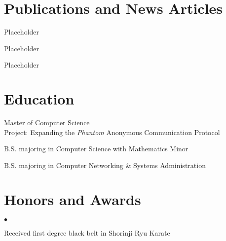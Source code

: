 \documentclass{resume}
\begin{document}
\section{Publications and News Articles}
\begin{position}
  \item Placeholder
\end{position}

\begin{position}
  \item Placeholder
\end{position}

\begin{position}
  \item Placeholder
\end{position}

\section{Education}
\begin{school}
 \item Master of Computer Science\\
 {Project:} {\sffamily Expanding the \emph{Phantom} Anonymous Communication Protocol}\\
\end{school}

\begin{school}
     \item B.S. majoring in Computer Science with Mathematics Minor
     \item B.S. majoring in Computer Networking \& Systems Administration
\end{school}

\section{Honors and Awards}
    \begin{list}{$\bullet$}{\topsep \itemsep}
      \item Received first degree black belt in Shorinji Ryu Karate
    \end{list}
\end{document}
